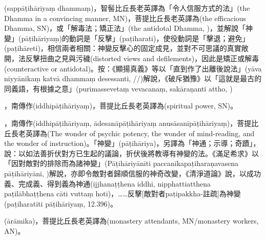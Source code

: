 \startitemgroup[noteitems]
\item{}(sappāṭihāriyaṃ dhammaṃ)，智髻比丘長老英譯為「令人信服方式的法」(the Dhamma in a convincing manner, MN)，菩提比丘長老英譯為(the efficacious Dhamma, SN)，或「解毒法；矯正法」(the antidotal Dhamma, )，並解說「神變」(pāṭihāriyaṃ)的動詞是「反擊」(paṭiharati)，使役動詞是「擊退；避免」(paṭihāreti)，相信兩者相關：神變反擊心的固定成見，並對不可思議的真實敞開，法反擊扭曲之見與污穢(distorted views and defilements)，因此是矯正或解毒(counteractive or antidotal)。按：《顯揚真義》等以「直到作了出離後說法」(yāva niyyānikaṃ katvā dhammaṃ desessanti, //)解說，《破斥猶豫》以「這就是最古的同義語，有根據之意」(purimassevetaṃ vevacanaṃ, sakāraṇanti attho, )
\stopitemgroup

\startitemgroup[noteitems]
\item{}，南傳作(iddhipāṭihāriyaṃ)，菩提比丘長老英譯為(spiritual power, SN)。
\item{}，南傳作(iddhipāṭihāriyaṃ, ādesanāpāṭihāriyaṃ anusāsanīpāṭihāriyaṃ)，菩提比丘長老英譯為(The wonder of psychic potency, the wonder of mind-reading, and the wonder of instruction)。「神變」(pāṭihāriya)，另譯為「神通；示導；奇蹟」，說：以如法善折伏對方已生起的議論，折伏後將教導有神變的法。《滿足希求》以「因對敵對的排除而為諸神變」(Pāṭihāriyānīti paccanīkapaṭiharaṇavasena pāṭihāriyāni, )解說，亦即令敵對者歸順信服的神奇改變，《清淨道論》說，以成功義、完成義、得到義為神通(ijjhanaṭṭhena iddhi, nipphattiatthena paṭilābhaṭṭhena cāti vuttaṃ hoti)，……反擊[敵對者paṭipakkha-註疏]為神變(paṭiharatīti pāṭihāriyaṃ, 12.396)。
\stopitemgroup

\startitemgroup[noteitems]
\item{}(ārāmika)，菩提比丘長老英譯為(monastery attendants, MN/monastery workers, AN)。
\stopitemgroup

